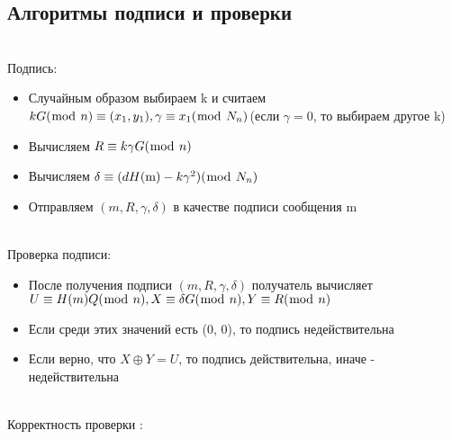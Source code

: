 \documentclass[a4paper]{article}
\begin{document}
\subsection*{Алгоритмы подписи и проверки}\\
\caption{Подпись: }
\begin{itemize}
    \item Случайным образом выбираем k и считаем \\
    $kG({\bmod}\ n)\equiv(x_{1},y_{1}), \gamma\equiv x_{1}({\bmod}\ N_{n})$(если $\gamma = 0$, то выбираем другое k) 
    \item Вычисляем $R\equiv k\gamma G({\bmod}\ n)$
    \item Вычисляем $\delta\equiv(dH({\rm m})-k\gamma^{2})({\bmod}\ N_{n})$
    \item Отправляем $(m, R, \gamma, \delta)$ в качестве подписи сообщения m
\end{itemize}
\\
\caption{Проверка подписи: }
\begin{itemize}
    \item После получения подписи $(m, R, \gamma, \delta)$ получатель вычисляет $U\equiv H(m)Q({\bmod}\ n), X\equiv\delta G({\bmod}\ n), Y\equiv R({\bmod}\ n)$
    \item Если среди этих значений есть (0, 0), то подпись недействительна
    \item Если верно, что $X\oplus Y=U$, то подпись действительна, иначе - недействительна
\end{itemize}\\
\caption{Корректность проверки :}\\
\end{document}
